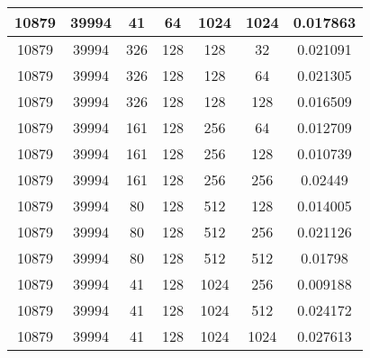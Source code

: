 \documentclass[9pt]{article}
\begin{document}
\begin{tabular}{|c|c|c|c|c|c|c| }
\hline
10879  & 39994  & 41  & 64  & 1024  & 1024  & 0.017863 \\
\hline
10879  & 39994  & 326  & 128  & 128  & 32  & 0.021091 \\
\hline
10879  & 39994  & 326  & 128  & 128  & 64  & 0.021305 \\
\hline
10879  & 39994  & 326  & 128  & 128  & 128  & 0.016509 \\
\hline
10879  & 39994  & 161  & 128  & 256  & 64  & 0.012709 \\
\hline
10879  & 39994  & 161  & 128  & 256  & 128  & 0.010739 \\
\hline
10879  & 39994  & 161  & 128  & 256  & 256  & 0.02449 \\
\hline
10879  & 39994  & 80  & 128  & 512  & 128  & 0.014005 \\
\hline
10879  & 39994  & 80  & 128  & 512  & 256  & 0.021126 \\
\hline
10879  & 39994  & 80  & 128  & 512  & 512  & 0.01798 \\
\hline
10879  & 39994  & 41  & 128  & 1024  & 256  & 0.009188 \\
\hline
10879  & 39994  & 41  & 128  & 1024  & 512  & 0.024172 \\
\hline
10879  & 39994  & 41  & 128  & 1024  & 1024  & 0.027613 \\
\hline
\end{tabular}
 
\end{document}
